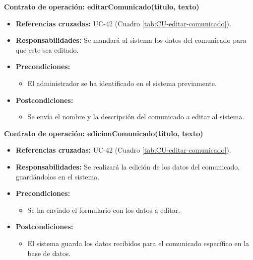 \textbf{Contrato de operación: editarComunicado(titulo, texto)}
\begin{itemize}
\item \textbf{Referencias cruzadas:} UC-42 (Cuadro \ref{tab:CU-editar-comunicado}).
\item \textbf{Responsabilidades:} Se mandará al sistema los datos del comunicado para que este sea editado.
\item \textbf{Precondiciones:} 
 \begin{itemize}
\item El administrador se ha identificado en el sistema previamente.
\end {itemize}
\item \textbf{Postcondiciones:} 
 \begin{itemize}
\item Se envía el nombre y la descripción del comunicado a editar al sistema.
\end {itemize}
\end {itemize}

\textbf{Contrato de operación: edicionComunicado(titulo, texto)}
\begin{itemize}
\item \textbf{Referencias cruzadas:} UC-42 (Cuadro \ref{tab:CU-editar-comunicado}).
\item \textbf{Responsabilidades:} Se realizará la edición de los datos del comunicado, guardándolos en el sistema.
\item \textbf{Precondiciones:} 
 \begin{itemize}
\item Se ha enviado el formulario con los datos a editar.
\end {itemize}
\item \textbf{Postcondiciones:} 
 \begin{itemize}
\item El sistema guarda los datos recibidos para el comunicado específico en la base de datos.
\end {itemize}
\end {itemize}

